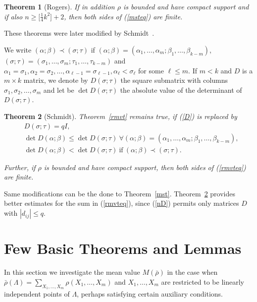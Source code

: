 \documentclass[11pt]{article}
\newtheorem{theorem}{Theorem}[section]
\theoremstyle{definition}
\theoremstyle{proof}
\begin{document}
\begin{theorem}[Rogers]
    If in addition $\rho$ is bounded and have compact support and if also $n \geq  \big[\frac{1}{4} k ^2\big] + 2$, then both sides of (\ref{msteq}) are finite.
\end{theorem}

These theorems were later modified by Schmidt~\cite{schmidt58}.

We write $(\alpha; \beta ) \prec (\sigma ; \tau )$ if $(\alpha ; \beta ) = ( \alpha _1, \ldots, \alpha _m; \beta _1, \ldots, \beta _{k-m})$, $(\sigma ; \tau ) = (\sigma _1, \ldots, \sigma _m; \tau _1, \ldots, \tau _{k-m})$ and $\alpha _1 = \sigma _1, \alpha _2 = \sigma _2, \ldots , \alpha _{\ell - 1} = \sigma _{\ell - 1}, \alpha _\ell < \sigma _\ell  $ for some $\ell \leq m$.
If $m<k$ and $D$ is a $m \times k$ matrix, we denote by $D(\sigma ; \tau )$ the square submatrix with columns $\sigma _1, \sigma _2, \ldots , \sigma _m$ and let be $\det D(\sigma ; \tau )$ the absolute value of the determinant of $D(\sigma; \tau )$.

\begin{theorem}[Schmidt]\label{schmvt}
    Theorem~\ref{rmvt} remains true, if (\ref{D}) is replaced by
    \begin{equation}\label{nD}
        \begin{split}
            & D(\sigma ; \tau ) = qI, \\
            & \det D(\alpha ; \beta ) \leq  \det D (\sigma ; \tau ) \ \forall (\alpha ; \beta ) = (\alpha _1, \ldots, \alpha _m ; \beta _1, \ldots, \beta _{k-m}), \\
            & \det D(\alpha; \beta ) < \det D(\sigma; \tau ) \ \text{if} \ (\alpha; \beta ) \prec (\sigma ; \tau ).
        \end{split}
    \end{equation}

    Further, if $\rho$ is bounded and have compact support, then both sides of (\ref{rmvteq}) are finite.
\end{theorem}

Same modifications can be the done to Theorem~\ref{mst}.
Theorem~\ref{schmvt} provides better estimates for the sum in (\ref{rmvteq}), since (\ref{nD}) permits only matrices $D$ with $|d_{ij}| \leq q$.

\section{Few Basic Theorems and Lemmas}
In this section we investigate the mean value $M(\bar{\rho })$ in the case when $\bar{\rho} (\Lambda ) = \displaystyle\sum_{X_1, \ldots, X_m} \rho (X_1, \ldots, X_m)$ and $X_1, \ldots, X_m$ are restricted to be linearly independent points of $\Lambda$, perhaps satisfying certain auxiliary conditions.
\end{document}
